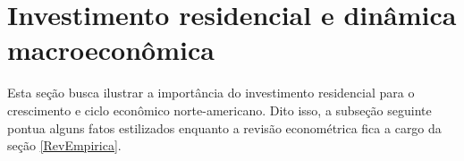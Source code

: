 \section{Investimento residencial e dinâmica macroeconômica}
\label{Secao_Residencial}

Esta seção busca ilustrar a importância do investimento residencial para o crescimento e ciclo econômico norte-americano. 
Dito isso, a subseção seguinte pontua alguns fatos estilizados enquanto a revisão econométrica fica a cargo da seção \ref{RevEmpirica}.








